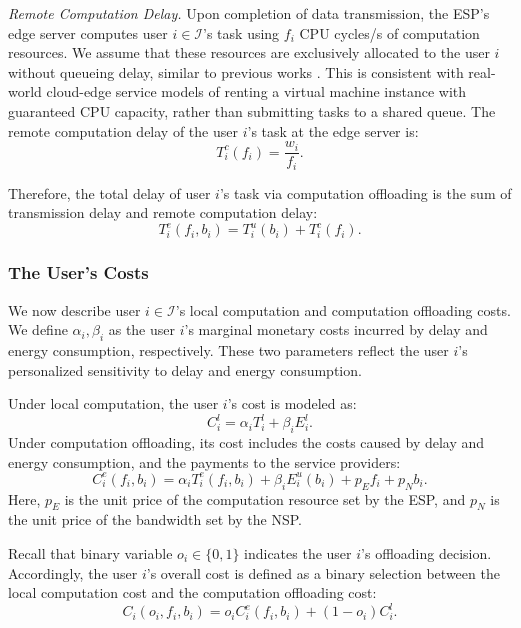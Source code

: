 \documentclass[lettersize,journal]{IEEEtran}
\begin{document}
\emph{Remote Computation Delay.} 
Upon completion of data transmission, the ESP's edge server computes user $i\in\mathcal{I}$'s task using $f_i$ CPU cycles/s of computation resources. We assume that these resources are exclusively allocated to the user $i$ without queueing delay, similar to previous works \cite{tutuncuoglu2024joint,chu2023efficient}. This is consistent with real-world cloud-edge service models of renting a virtual machine instance with guaranteed CPU capacity, rather than submitting tasks to a shared queue. The remote computation delay of the user $i$'s task at the edge server is:
\begin{equation}\label{eq:T^c_i}
    T^c_i(f_i)=\frac{w_i}{f_i}.
\end{equation}

Therefore, the total delay of user $i$'s task via computation offloading is the sum of transmission delay and remote computation delay:
\begin{equation}
    T^e_i(f_i,b_i)=T^u_i(b_i)+T^c_i(f_i).
\end{equation}

\subsubsection{The User's Costs}  
We now describe user $i\in\mathcal{I}$'s local computation and computation offloading costs. 
We define $\alpha_i,\beta_i$ as the user $i$'s marginal monetary costs incurred by delay and energy consumption, respectively. These two parameters reflect the user $i$'s personalized sensitivity to delay and energy consumption.

Under local computation, the user $i$'s cost is modeled as:
\begin{equation}
    C^l_i = \alpha_i T^l_i+\beta_iE^l_i.
\end{equation}
Under computation offloading, its cost includes the costs caused by delay and energy consumption, and the payments to the service providers:
\begin{equation}\label{eq:C^e_i}
    C^e_i(f_i,b_i) = \alpha_i T^e_i(f_i,b_i) + \beta_iE^u_i(b_i) + p_E f_i + p_N b_i.
\end{equation}
Here, $p_E$ is the unit price of the computation resource set by the ESP, and $p_N$ is the unit price of the bandwidth set by the NSP.

Recall that binary variable $o_i \in \{0,1\}$ indicates the user $i$'s offloading decision. Accordingly, the user $i$'s overall cost is defined as a binary selection between the local computation cost and the computation offloading cost:
\begin{equation}\label{Equation:C_i}
    C_i(o_i,f_i,b_i) = o_i C^e_i(f_i,b_i) + (1-o_i) C^l_i.
\end{equation}
\end{document}
